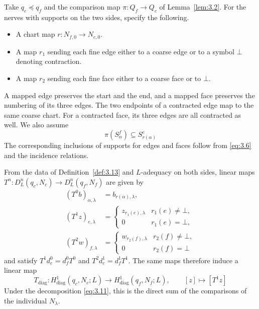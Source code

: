\begin{definition}\label{def:3.13}

Take $q_c\preceq q_f$ and the comparison map $\pi:Q_f\to Q_c$ of Lemma~\ref{lem:3.2}.
For the nerves with supports on the two sides, specify the following.

\begin{itemize}
\item A chart map $r:N_{f,0}\to N_{c,0}$.
\item A map $r_1$ sending each fine edge either to a coarse edge or to a symbol
$\bot$ denoting contraction.
\item A map $r_2$ sending each fine face either to a coarse face or to $\bot$.
\end{itemize}

A mapped edge preserves the start and the end, and a mapped face preserves the
numbering of its three edges.
The two endpoints of a contracted edge map to the same coarse chart.
For a contracted face, its three edges are all contracted as well.
We also assume
\begin{equation*}
\pi(S^f_\alpha)\subseteq S^c_{r(\alpha)}
\tag{3.12}\label{eq:3.12}
\end{equation*}
The corresponding inclusions of supports for edges and faces follow from
\eqref{eq:3.6} and the incidence relations.

\end{definition}

\begin{proposition}\label{prop:3.14}

From the data of Definition~\ref{def:3.13} and $L$-adequacy on both sides, linear
maps $T^n:D_L^n(q_c,N_c)\to D_L^n(q_f,N_f)$ are given by
\begin{equation*}
\begin{aligned}
(T^0b)_{\alpha,\lambda}&=b_{r(\alpha),\lambda},\\
(T^1z)_{e,\lambda}
&=\begin{cases}
z_{r_1(e),\lambda}&r_1(e)\ne\bot,\\
0&r_1(e)=\bot,
\end{cases}\\
(T^2w)_{f,\lambda}
&=\begin{cases}
w_{r_2(f),\lambda}&r_2(f)\ne\bot,\\
0&r_2(f)=\bot
\end{cases}
\end{aligned}
\tag{3.13}\label{eq:3.13}
\end{equation*}
and satisfy $T^1d_c^0=d_f^0T^0$ and $T^2d_c^1=d_f^1T^1$.
The same maps therefore induce a linear map
\begin{equation*}
T_{\mathrm{diag}}:
H^1_{\mathrm{diag}}(q_c,N_c;L)
\longrightarrow H^1_{\mathrm{diag}}(q_f,N_f;L),
\qquad [z]\longmapsto[T^1z]
\tag{3.14}\label{eq:3.14}
\end{equation*}
Under the decomposition \eqref{eq:3.11}, this is the direct sum of the comparisons of
the individual $N_\lambda$.

\end{proposition}

